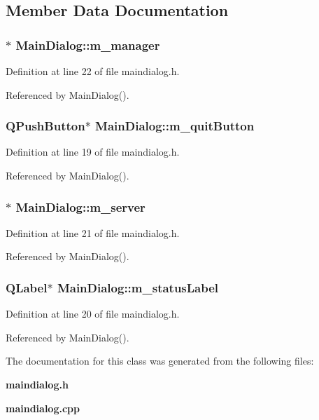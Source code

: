 \subsection{Member Data Documentation}
\subsubsection{$\ast$ {\bf MainDialog::m\_\-manager}\hspace{0.3cm}{\tt  [private]}}\label{classMainDialog_14d2ae30077e1aabcdcf7f15b1e2cb03}




Definition at line 22 of file maindialog.h.

Referenced by MainDialog().
\subsubsection{\setlength{\rightskip}{0pt plus 5cm}QPushButton$\ast$ {\bf MainDialog::m\_\-quitButton}\hspace{0.3cm}{\tt  [private]}}\label{classMainDialog_fdfb6e1bd6ec0b8d4349a7e2b43012b7}




Definition at line 19 of file maindialog.h.

Referenced by MainDialog().
\subsubsection{$\ast$ {\bf MainDialog::m\_\-server}\hspace{0.3cm}{\tt  [private]}}\label{classMainDialog_13b62159900b46462a4ec35c7ac84928}




Definition at line 21 of file maindialog.h.

Referenced by MainDialog().
\subsubsection{\setlength{\rightskip}{0pt plus 5cm}QLabel$\ast$ {\bf MainDialog::m\_\-statusLabel}\hspace{0.3cm}{\tt  [private]}}\label{classMainDialog_5c1d7e2ff68fde3980a043a6a239fc59}




Definition at line 20 of file maindialog.h.

Referenced by MainDialog().

The documentation for this class was generated from the following files:\begin{CompactItemize}
\item 
{\bf maindialog.h}\item 
{\bf maindialog.cpp}\end{CompactItemize}

